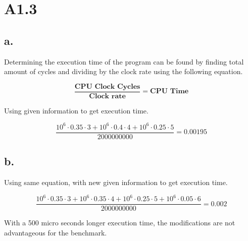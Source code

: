 \section*{A1.3}

\subsection*{a.}
Determining the execution time of the program can be found by finding total amount of cycles and dividing by the clock rate using the following equation.

$$ \frac{\textbf{CPU Clock Cycles}}{\textbf{Clock rate}} = \textbf{CPU Time} $$

Using given information to get execution time.

$$\frac{10^6\cdot0.35\cdot3+10^6\cdot0.4\cdot4+10^6\cdot0.25\cdot5}{2000000000} = 0.00195 $$

\subsection*{b.}

Using same equation, with new given information to get execution time.

$$\frac{10^6\cdot0.35\cdot3+10^6\cdot0.35\cdot4+10^6\cdot0.25\cdot5+10^6\cdot0.05\cdot6}{2000000000} = 0.002 $$

With a 500 micro seconds longer execution time, the modifications are not advantageous for the benchmark.